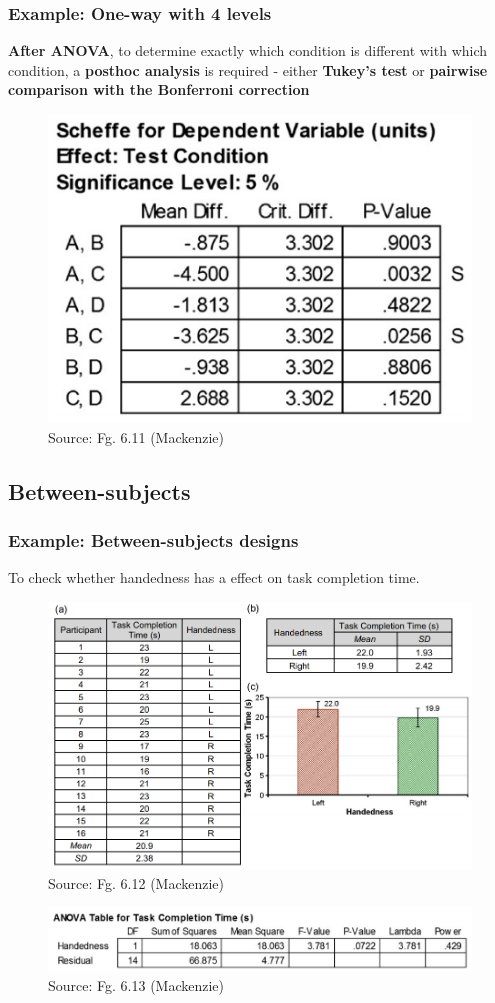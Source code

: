 \documentclass{beamer}
\begin{document}
\begin{frame}
	\frametitle{Example: One-way with 4 levels} 
	\textbf{After ANOVA}, to determine exactly which condition is different with which condition, a \textbf{posthoc analysis} is required - either \textbf{Tukey's test} or \textbf{pairwise comparison with the Bonferroni correction}
	\begin{figure}
		\includegraphics[width=0.5\linewidth]{posthoc}
		\caption{Source: Fg. 6.11 (Mackenzie)}
	\end{figure}
\end{frame}

\subsection{Between-subjects}

\begin{frame}
	\footnotesize
	\frametitle{Example: Between-subjects designs} 
	To check whether handedness has a effect on task completion time.
	\begin{figure}
		\includegraphics[width=0.5\linewidth]{between}
		\caption{Source: Fg. 6.12 (Mackenzie)}
	\end{figure}
	\begin{figure}
		\includegraphics[width=0.6\linewidth]{between2}
		\caption{Source: Fg. 6.13 (Mackenzie)}
	\end{figure}
\end{frame}
\end{document}
